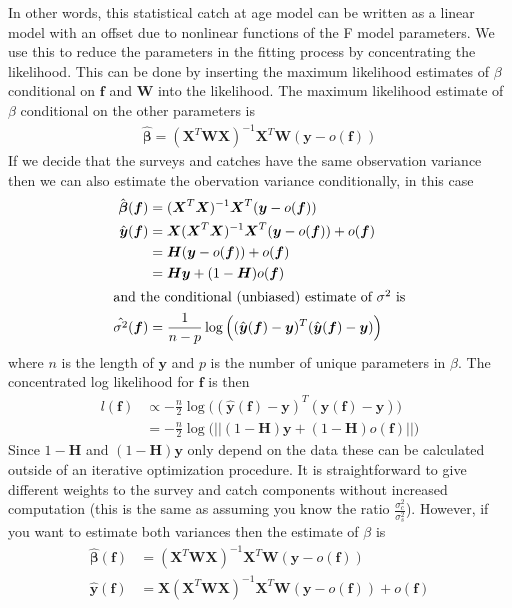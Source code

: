 \documentclass[a4paper,english]{article}
\begin{document}
In other words, this statistical catch at age model can be written as a linear model with an offset due to nonlinear functions of the F model parameters.  We use this to reduce the parameters in the fitting process by concentrating the likelihood.  This can be done by inserting the maximum likelihood estimates of $\beta$ conditional on $\bm{f}$ and $\bm{W}$ into the likelihood. The maximum likelihood estimate of $\beta$ conditional on the other parameters is
\begin{align*}
\hat{\bm{\beta}} = (\bm{X}^T\bm{WX})^{-1}\bm{X}^T\bm{W}(\bm{y} - o(\bm{f}))
\end{align*}
If we decide that the surveys and catches have the same observation variance then we can also estimate the obervation variance conditionally, in this case
\begin{align*}
  \hat{\mbox{\boldmath $\beta$}}(\mbox{\boldmath $f$}) &= (\mbox{\boldmath $X$}^T\mbox{\boldmath $X$})^{-1}\mbox{\boldmath $X$}^T(\mbox{\boldmath $y$} - o(\mbox{\boldmath $f$})) \\
  \hat{\mbox{\boldmath $y$}}(\mbox{\boldmath $f$}) &= \mbox{\boldmath $X$}(\mbox{\boldmath $X$}^T\mbox{\boldmath $X$})^{-1}\mbox{\boldmath $X$}^T(\mbox{\boldmath $y$} - o(\mbox{\boldmath $f$})) + o(\mbox{\boldmath $f$}) \\
                       &= \mbox{\boldmath $H$}(\mbox{\boldmath $y$} - o(\mbox{\boldmath $f$})) + o(\mbox{\boldmath $f$}) \\
                       &= \mbox{\boldmath $H$}\mbox{\boldmath $y$} + (1-\mbox{\boldmath $H$})o(\mbox{\boldmath $f$}) \\
  \intertext{and the conditional (unbiased) estimate of $\sigma^2$ is}
  \hat{\sigma^2}(\mbox{\boldmath $f$}) &= \frac{1}{n-p}\log\Big((\hat{\mbox{\boldmath $y$}}(\mbox{\boldmath $f$}) - \mbox{\boldmath $y$})^T(\hat{\mbox{\boldmath $y$}}(\mbox{\boldmath $f$}) - \mbox{\boldmath $y$})\Big)
\end{align*}
where $n$ is the length of $\bm{y}$ and $p$ is the number of unique parameters in $\beta$. The concentrated log likelihood for $\bm{f}$ is then
\begin{align*}
  l(\bm{f}) &\propto -\frac{n}{2}\log\Big((\hat{\bm{y}}(\bm{f}) - \bm{y})^T(\hat{\bm{y}}(\bm{f}) - \bm{y})\Big) \\
            &= -\frac{n}{2}\log\Bigg(\Big|\Big| (1-\bm{H})\bm{y} + (1-\bm{H})o(\bm{f})\Big|\Big|\Bigg)
\end{align*}
Since $1-\bm{H}$ and $(1-\bm{H})\bm{y}$ only depend on the data these can be calculated outside of an iterative optimization procedure.  It is straightforward to give different weights to the survey and catch components without increased computation (this is the same as assuming you know the ratio $\frac{\sigma_c^2}{\sigma_s^2}$).  However, if you want to estimate both variances then the estimate of $\beta$ is
\begin{align*}
  \hat{\bm{\beta}}(\bm{f}) &= (\bm{X}^T\bm{WX})^{-1}\bm{X}^T\bm{W}(\bm{y} - o(\bm{f})) \\
  \hat{\bm{y}}(\bm{f}) &= \bm{X}(\bm{X}^T\bm{WX})^{-1}\bm{X}^T\bm{W}(\bm{y} - o(\bm{f})) + o(\bm{f}) 
\end{align*}
\end{document}
